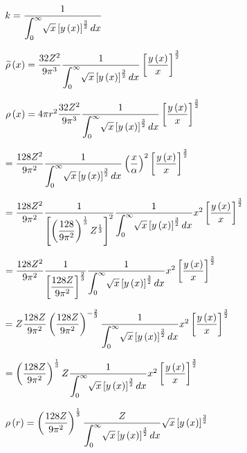 \documentclass{jarticle}%
\begin{document}
$k=\dfrac{1}{%
{\displaystyle\int_{0}^{\infty}}
\sqrt{x}\left[  y\left(  x\right)  \right]  ^{\frac{3}{2}}dx}$

$\widetilde{\rho}\left(  x\right)  =\dfrac{32Z^{2}}{9\pi^{3}}\dfrac{1}{%
{\displaystyle\int_{0}^{\infty}}
\sqrt{x}\left[  y\left(  x\right)  \right]  ^{\frac{3}{2}}dx}\left[
\dfrac{y\left(  x\right)  }{x}\right]  ^{\frac{3}{2}}$

$\rho\left(  x\right)  =4\pi r^{2}\dfrac{32Z^{2}}{9\pi^{3}}\dfrac{1}{%
{\displaystyle\int_{0}^{\infty}}
\sqrt{x}\left[  y\left(  x\right)  \right]  ^{\frac{3}{2}}dx}\left[
\dfrac{y\left(  x\right)  }{x}\right]  ^{\frac{3}{2}}$

$=\dfrac{128Z^{2}}{9\pi^{2}}\dfrac{1}{%
{\displaystyle\int_{0}^{\infty}}
\sqrt{x}\left[  y\left(  x\right)  \right]  ^{\frac{3}{2}}dx}\left(  \dfrac
{x}{\alpha}\right)  ^{2}\left[  \dfrac{y\left(  x\right)  }{x}\right]
^{\frac{3}{2}}$

$=\dfrac{128Z^{2}}{9\pi^{2}}\dfrac{1}{\left[  \left(  \dfrac{128}{9\pi^{2}%
}\right)  ^{\frac{1}{3}}Z^{\frac{1}{3}}\right]  ^{2}}\dfrac{1}{%
{\displaystyle\int_{0}^{\infty}}
\sqrt{x}\left[  y\left(  x\right)  \right]  ^{\frac{3}{2}}dx}x^{2}\left[
\dfrac{y\left(  x\right)  }{x}\right]  ^{\frac{3}{2}}$

$=\dfrac{128Z^{2}}{9\pi^{2}}\dfrac{1}{\left[  \dfrac{128Z}{9\pi^{2}}\right]
^{\frac{2}{3}}}\dfrac{1}{%
{\displaystyle\int_{0}^{\infty}}
\sqrt{x}\left[  y\left(  x\right)  \right]  ^{\frac{3}{2}}dx}x^{2}\left[
\dfrac{y\left(  x\right)  }{x}\right]  ^{\frac{3}{2}}$

$=Z\dfrac{128Z}{9\pi^{2}}\left(  \dfrac{128Z}{9\pi^{2}}\right)  ^{-\frac{2}%
{3}}\dfrac{1}{%
{\displaystyle\int_{0}^{\infty}}
\sqrt{x}\left[  y\left(  x\right)  \right]  ^{\frac{3}{2}}dx}x^{2}\left[
\dfrac{y\left(  x\right)  }{x}\right]  ^{\frac{3}{2}}$

$=\left(  \dfrac{128Z}{9\pi^{2}}\right)  ^{\frac{1}{3}}Z\dfrac{1}{%
{\displaystyle\int_{0}^{\infty}}
\sqrt{x}\left[  y\left(  x\right)  \right]  ^{\frac{3}{2}}dx}x^{2}\left[
\dfrac{y\left(  x\right)  }{x}\right]  ^{\frac{3}{2}}$

$\rho\left(  r\right)  =\left(  \dfrac{128Z}{9\pi^{2}}\right)  ^{\frac{1}{3}%
}\dfrac{Z}{%
{\displaystyle\int_{0}^{\infty}}
\sqrt{x}\left[  y\left(  x\right)  \right]  ^{\frac{3}{2}}dx}\sqrt{x}\left[
y\left(  x\right)  \right]  ^{\frac{3}{2}}$
\end{document}
